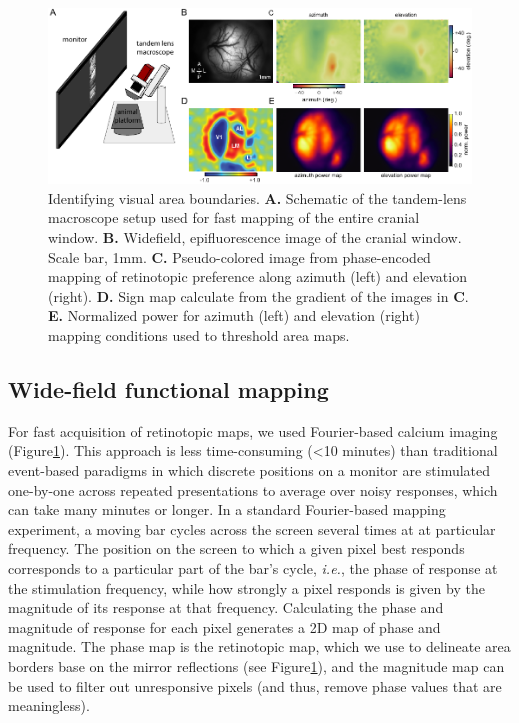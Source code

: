 \begin{figure}
    \includegraphics[width=\textwidth]{figures/chapter_2/fig_2-5_retino_mapping/fig_2-5_retino_mapping.pdf}
    \vspace{.1in}
    \caption[Wide-field mapping]{Identifying visual area boundaries. 
    \textbf{A.} Schematic of the tandem-lens macroscope setup used for fast mapping of the entire cranial window. 
    \textbf{B.} Widefield, epifluorescence image of the cranial window. Scale bar, 1mm.
    \textbf{C.} Pseudo-colored image from phase-encoded mapping of retinotopic preference along azimuth (left) and elevation (right). 
    \textbf{D.} Sign map calculate from the gradient of the images in \textbf{C}. \textbf{E.} Normalized power for azimuth (left) and elevation (right) mapping conditions used to threshold area maps. 
    \label{fig:retino_mapping}}
\end{figure}

\subsection{Wide-field functional mapping}
For fast acquisition of retinotopic maps, we used Fourier-based calcium imaging\cite{Kalatsky2003} (Figure\ref{fig:retino_mapping}). This approach is less time-consuming (<10 minutes) than traditional event-based paradigms in which discrete positions on a monitor are stimulated one-by-one across repeated presentations to average over noisy responses, which can take many minutes or longer. In a standard Fourier-based mapping experiment, a moving bar cycles across the screen several times at at particular frequency. The position on the screen to which a given pixel best responds corresponds to a particular part of the bar's cycle, \textit{i.e.}, the phase of response at the stimulation frequency, while how strongly a pixel responds is given by the magnitude of its response at that frequency. Calculating the phase and magnitude of response for each pixel generates a 2D map of phase and magnitude. The phase map is the retinotopic map, which we use to delineate area borders base on the mirror reflections (see Figure\ref{fig:retino_mapping}), and the magnitude map can be used to filter out unresponsive pixels (and thus, remove phase values that are meaningless). 

